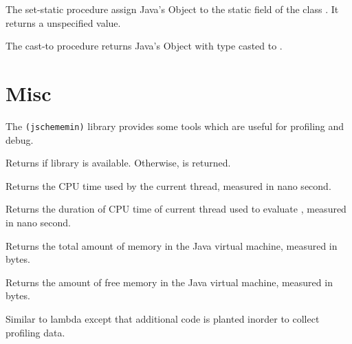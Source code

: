 \begin{entry}{%
}

The {\cf set-static} procedure assign Java's Object  to the static field  of the class . It returns a unspecified value.

\end{entry}



\begin{entry}{%
}

The {\cf cast-to} procedure returns Java's Object  with type casted to .

\end{entry}

\section{Misc}
\label{miscsection}

The {\tt (jschememin)} library provides some tools which are useful for profiling and debug.

\begin{entry}{%
}
Returns \schtrue{} if library  is available.
Otherwise, \schfalse{} is returned.
\end{entry}

\begin{entry}{%
}
Returns the CPU time used by the current thread, measured in nano second.
\end{entry}

\begin{entry}{%
}
Returns the duration of CPU time of current thread used to evaluate , measured in nano second. 
\end{entry}

\begin{entry}{%
}
Returns the total amount of memory in the Java virtual machine, measured in bytes. 
\end{entry}

\begin{entry}{%
}
Returns the amount of free memory in the Java virtual machine, measured in bytes. 
\end{entry}

\begin{entry}{%
}
Similar to lambda except that additional code is planted inorder to collect profiling data. 
\end{entry}

